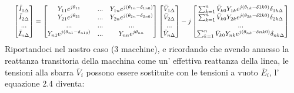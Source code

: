 \documentclass[Lau,noexaminfo]{sapthesis}
\begin{document}
	\begin{equation}
	\resizebox{0.98\hsize}{!}{%
	$\begin{bmatrix}
	\bar{I}_{1\Delta}\\
	\bar{I}_{2\Delta}\\
	...\\
	\bar{I}_{n\Delta}\\
	\end{bmatrix}=
	\begin{bmatrix}
	Y_{11}e^{j\theta_{11}} & ... & Y_{1n}e^{j(\theta_{1n}-\delta_{1n0})}\\
	Y_{21}e^{j\theta_{21}} & ... & Y_{2n}e^{j(\theta_{2n}-\delta_{2n0})}\\
	... & ... & ...\\
	Y_{n1}e^{j(\theta_{n1}-\delta_{n10})} & ... & Y_{nn}e^{j\theta_{nn}}
	\end{bmatrix}
	\begin{bmatrix}
	\bar{V}_{1\Delta}\\
	\bar{V}_{2\Delta}\\
	...\\
	\bar{V}_{n\Delta}\\
	\end{bmatrix}-j
	\begin{bmatrix}
	\sum_{k=1}^{n}\bar{V}_{k0}Y_{1k}e^{j(\theta_{1k}-\delta{1k0})}\delta_{1k\Delta}\\
	\sum_{k=1}^{n}\bar{V}_{k0}Y_{2k}e^{j(\theta_{2k}-\delta{2k0})}\delta_{2k\Delta}\\
	...\\
	\sum_{k=1}^{n}\bar{V}_{k0}Y_{nk}e^{j(\theta_{nk}-\delta{nk0})}\delta_{nk\Delta}\\
	\end{bmatrix}$
	}
	\end{equation}
	Riportandoci nel nostro caso (3 macchine), e ricordando che avendo annesso la reattanza transitoria della macchina come un' effettiva reattanza della linea, le tensioni alla sbarra $\bar{V}_i$ possono essere sostituite con le tensioni a vuoto $\bar{E}_i$, l' equazione 2.4 diventa:\\
\end{document}
